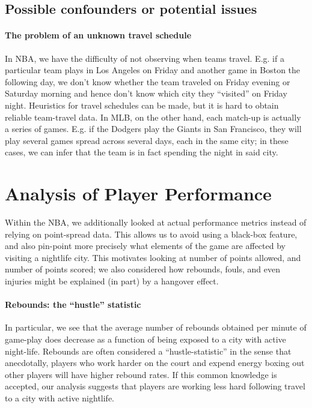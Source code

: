 \documentclass[letterpaper,12pt]{article}
\begin{document}
\subsection{Possible confounders or potential issues}

\paragraph{The problem of an unknown travel schedule} In NBA, we have the difficulty of not observing when teams travel. E.g. if a particular team  plays
in Los Angeles on Friday and another game in Boston the following day, we don't
know whether the team traveled on Friday evening or Saturday morning and hence don't know
which city they ``visited'' on Friday night. Heuristics for
travel schedules can be made, but it is hard to obtain reliable team-travel data.
In MLB, on the other hand, each match-up is actually a series of games. E.g.
if the Dodgers play the Giants in San Francisco, they will play several games spread
across several days, each in the same city; in these cases, we can infer that the team
is in fact spending the night in said city.


\section{Analysis of Player Performance}
Within the NBA, we additionally looked at actual performance metrics instead of relying on point-spread data. 
This allows us to avoid using a black-box feature, and also pin-point
more precisely what elements of the game are affected by visiting a nightlife city. This motivates looking at number of points allowed, and number of points scored; we also considered how rebounds, fouls, and even injuries might be 
explained (in part) by a hangover effect.

\paragraph{Rebounds: the ``hustle'' statistic}
In particular, we see that the average number of rebounds obtained per minute
of game-play does decrease as a function of being exposed to a city with active night-life. Rebounds are often considered a ``hustle-statistic'' in the sense 
that anecdotally, players who work harder on the court and expend energy boxing out
other players will have higher rebound rates. If this common knowledge is accepted,
our analysis suggests that players are working less hard following travel to a 
city with active nightlife.
\end{document}
